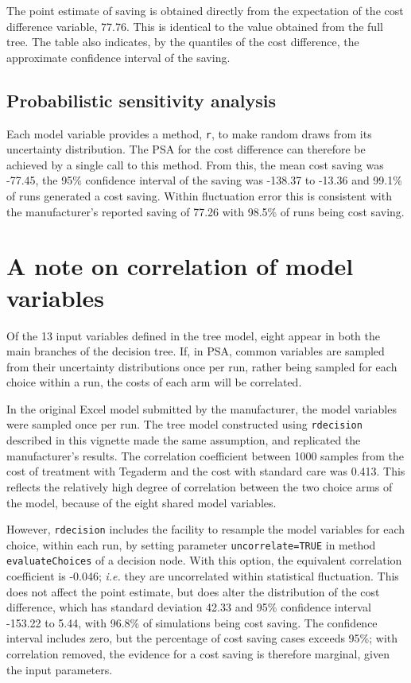\documentclass[]{article}
\begin{document}
The point estimate of saving is obtained directly from the expectation
of the cost difference variable, 77.76. This is identical to the value
obtained from the full tree. The table also indicates, by the quantiles
of the cost difference, the approximate confidence interval of the
saving.

\hypertarget{probabilistic-sensitivity-analysis}{%
\subsection{Probabilistic sensitivity
analysis}\label{probabilistic-sensitivity-analysis}}

Each model variable provides a method, \texttt{r}, to make random draws
from its uncertainty distribution. The PSA for the cost difference can
therefore be achieved by a single call to this method. From this, the
mean cost saving was -77.45, the 95\% confidence interval of the saving
was -138.37 to -13.36 and 99.1\% of runs generated a cost saving. Within
fluctuation error this is consistent with the manufacturer's reported
saving of 77.26 with 98.5\% of runs being cost saving.

\hypertarget{a-note-on-correlation-of-model-variables}{%
\section{A note on correlation of model
variables}\label{a-note-on-correlation-of-model-variables}}

Of the 13 input variables defined in the tree model, eight appear in
both the main branches of the decision tree. If, in PSA, common
variables are sampled from their uncertainty distributions once per run,
rather being sampled for each choice within a run, the costs of each arm
will be correlated.

In the original Excel model submitted by the manufacturer, the model
variables were sampled once per run. The tree model constructed using
\texttt{rdecision} described in this vignette made the same assumption,
and replicated the manufacturer's results. The correlation coefficient
between 1000 samples from the cost of treatment with Tegaderm and the
cost with standard care was 0.413. This reflects the relatively high
degree of correlation between the two choice arms of the model, because
of the eight shared model variables.

However, \texttt{rdecision} includes the facility to resample the model
variables for each choice, within each run, by setting parameter
\texttt{uncorrelate=TRUE} in method \texttt{evaluateChoices} of a
decision node. With this option, the equivalent correlation coefficient
is -0.046; \emph{i.e.} they are uncorrelated within statistical
fluctuation. This does not affect the point estimate, but does alter the
distribution of the cost difference, which has standard deviation 42.33
and 95\% confidence interval -153.22 to 5.44, with 96.8\% of simulations
being cost saving. The confidence interval includes zero, but the
percentage of cost saving cases exceeds 95\%; with correlation removed,
the evidence for a cost saving is therefore marginal, given the input
parameters.
\end{document}
